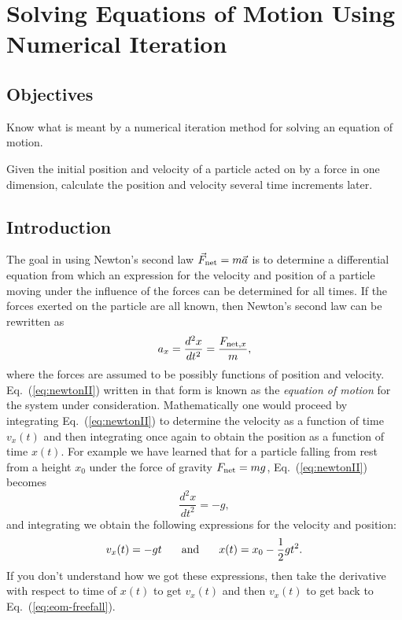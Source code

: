 \chapter[Numerical Iteration]{Solving Equations of Motion Using 
Numerical Iteration}
\label{chapter:numerical}

\section*{Objectives}
\begin{objectives}
\item Know what is meant by a numerical iteration method for solving
  an equation of motion.
\item Given the initial position and velocity of a particle acted on
  by a force in one dimension, calculate the position and velocity
  several time increments later.
\end{objectives}

\section{Introduction}

The goal in using Newton's second law $\vec{F}_{\rm net} = m\vec{a}$ is to determine a
differential equation from which an expression for the velocity and
position of a particle moving under the influence of the forces can be
determined for all times.  If the forces exerted on the particle are
all known, then Newton's second law can be rewritten as
\begin{equation}
  a_x = \frac{d^2x}{dt^2} = \frac{F_{{\rm net},x}}{m},
  \label{eq:newtonII}
\end{equation}
where the forces are assumed to be possibly functions of position and
velocity.  Eq.~(\ref{eq:newtonII}) written in that form is known as
the {\em equation of motion} for the system under consideration.
Mathematically one would proceed by integrating Eq.~(\ref{eq:newtonII}) 
to determine the velocity as a function of time
$v_x(t)$ and then integrating once again to obtain the position as a
function of time $x(t)$.  For example we have learned that for a
particle falling from rest from a height $x_0$ under the force of
gravity $F_{\rm net} = mg$, Eq.~(\ref{eq:newtonII}) becomes
\begin{equation}
  \frac{d^2x}{dt^2} = -g,
  \label{eq:eom-freefall}
\end{equation}
and integrating we obtain the following expressions for the velocity
and position:
\begin{equation}
  v_x(t) = -gt \mbox{\hspace{0.25in}and\hspace{0.25in}}x(t) = x_0 - 
  \frac{1}{2}gt^2.
\end{equation}
If you don't understand how we got these expressions, then take the
derivative with respect to time of $x(t)$ to get $v_x(t)$ and then
$v_x(t)$ to get back to Eq.~(\ref{eq:eom-freefall}).

